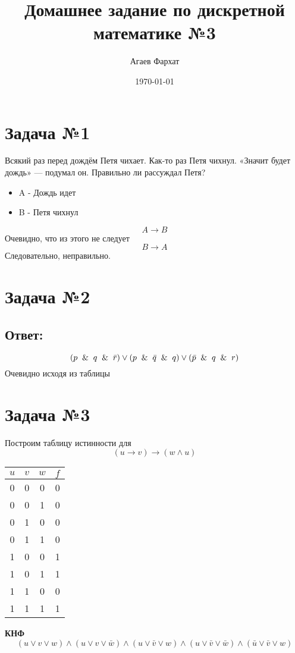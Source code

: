 \documentclass[a4paper, 12pt]{article} %
\author{Агаев Фархат}
\title{Домашнее задание по дискретной математике №3}
\date{\today}
\begin{document}

\maketitle

\section*{Задача №1}
Всякий раз перед дождём Петя чихает. Как-то раз Петя
чихнул. «Значит будет дождь» — подумал он. Правильно ли рассуждал
Петя?
\begin{itemize}
    \item A - Дождь идет
    \item B - Петя чихнул
\end{itemize}
\[A \rightarrow B\] 
Очевидно, что из этого не следует 
\[B \rightarrow A\] 
Следовательно, неправильно.
\section*{Задача №2}
\subsection*{Ответ:}
\[(p \And q \And \bar{r}) 
\vee ( p \And \bar{q} \And q) 
\vee (\bar{p} \And q \And r) \]
Очевидно исходя из таблицы




\section*{Задача №3}
Построим таблицу истинности для
\[(u \rightarrow  v) \rightarrow (w \wedge u)\]

\begin{center}
    \begin{tabular}{ |c|c|c|c| } 
     \hline
     $u$ & $v$ & $w$ & $f$ \\ 
     \hline
     0 & 0 & 0 & 0 \\ 
     \hline
     0 & 0 & 1 & 0 \\ 
     \hline
     0 & 1 & 0 & 0 \\ 
     \hline
     0 & 1 & 1 & 0 \\ 
     \hline
     1 & 0 & 0 & 1 \\ 
     \hline
     1 & 0 & 1 & 1 \\ 
     \hline
     1 & 1 & 0 & 0 \\ 
     \hline
     1 & 1 & 1 & 1 \\ 
     \hline
    \end{tabular}
\end{center}
\textbf{КНФ}
\[(u \vee v \vee w) \wedge 
(u \vee v \vee \bar{w}) \wedge
(u \vee \bar v \vee w) \wedge
(u \vee \bar v \vee \bar w) \wedge
(\bar u \vee \bar v \vee w) \]
\end{document}
